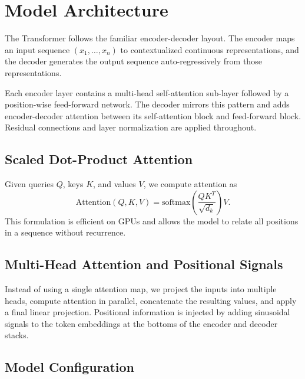 \section{Model Architecture}

The Transformer follows the familiar encoder-decoder layout. The encoder maps an input sequence $(x_1, \ldots, x_n)$ to contextualized continuous representations, and the decoder generates the output sequence auto-regressively from those representations.

Each encoder layer contains a multi-head self-attention sub-layer followed by a position-wise feed-forward network. The decoder mirrors this pattern and adds encoder-decoder attention between its self-attention block and feed-forward block. Residual connections and layer normalization are applied throughout.

\subsection{Scaled Dot-Product Attention}

Given queries $Q$, keys $K$, and values $V$, we compute attention as
\[
\mathrm{Attention}(Q, K, V) = \mathrm{softmax}\left(\frac{QK^T}{\sqrt{d_k}}\right)V.
\]
This formulation is efficient on GPUs and allows the model to relate all positions in a sequence without recurrence.

\subsection{Multi-Head Attention and Positional Signals}

Instead of using a single attention map, we project the inputs into multiple heads, compute attention in parallel, concatenate the resulting values, and apply a final linear projection. Positional information is injected by adding sinusoidal signals to the token embeddings at the bottoms of the encoder and decoder stacks.

\subsection{Model Configuration}

